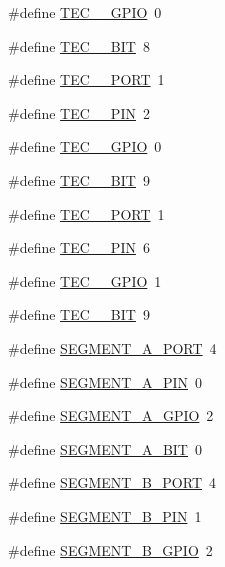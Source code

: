 \begin{DoxyCompactItemize}
\item 
\#define \hyperlink{group__hal_ga83ce1f0ab51ee7b4df55e629cdfc52d9}{T\+E\+C\+\_\+\_\+\+G\+P\+IO}~0
\item 
\#define \hyperlink{group__hal_gaed7549a304721e36693036c8a289ff4c}{T\+E\+C\+\_\+\_\+\+B\+IT}~8
\item 
\#define \hyperlink{group__hal_gac948c6a2caf0ef5cde7fa2c2e94fddb0}{T\+E\+C\+\_\+\_\+\+P\+O\+RT}~1
\item 
\#define \hyperlink{group__hal_gab976c4177676c5c89497cb89480e5dfe}{T\+E\+C\+\_\+\_\+\+P\+IN}~2
\item 
\#define \hyperlink{group__hal_gae8728c8f2e4279383925ff93a183b407}{T\+E\+C\+\_\+\_\+\+G\+P\+IO}~0
\item 
\#define \hyperlink{group__hal_ga64392cf03fba776f8a9dc238e25ec184}{T\+E\+C\+\_\+\_\+\+B\+IT}~9
\item 
\#define \hyperlink{group__hal_gadd513c832f5c617281c5df0dc67ae80c}{T\+E\+C\+\_\+\_\+\+P\+O\+RT}~1
\item 
\#define \hyperlink{group__hal_ga0b2447cd531de479b88f58f819566522}{T\+E\+C\+\_\+\_\+\+P\+IN}~6
\item 
\#define \hyperlink{group__hal_gaa5418f15596d7ada110c4105aa70e561}{T\+E\+C\+\_\+\_\+\+G\+P\+IO}~1
\item 
\#define \hyperlink{group__hal_gac7c8a49f0602d0aeee33923ce8708a4b}{T\+E\+C\+\_\+\_\+\+B\+IT}~9
\item 
\#define \hyperlink{group__hal_ga500ad2ec21fb16f64978b7bd003a1bf6}{S\+E\+G\+M\+E\+N\+T\+\_\+\+A\+\_\+\+P\+O\+RT}~4
\item 
\#define \hyperlink{group__hal_ga7aedeb2e8eecb0ba677b642f01ca6bd7}{S\+E\+G\+M\+E\+N\+T\+\_\+\+A\+\_\+\+P\+IN}~0
\item 
\#define \hyperlink{group__hal_ga94921c1a8815dfa09a147c982270fe23}{S\+E\+G\+M\+E\+N\+T\+\_\+\+A\+\_\+\+G\+P\+IO}~2
\item 
\#define \hyperlink{group__hal_gad1a6375015ba7b66143a96b950b2846f}{S\+E\+G\+M\+E\+N\+T\+\_\+\+A\+\_\+\+B\+IT}~0
\item 
\#define \hyperlink{group__hal_ga82edaa1ab6e1175396b7819fc1a742a4}{S\+E\+G\+M\+E\+N\+T\+\_\+\+B\+\_\+\+P\+O\+RT}~4
\item 
\#define \hyperlink{group__hal_ga8f8be8bc112341bb891770762ab53b85}{S\+E\+G\+M\+E\+N\+T\+\_\+\+B\+\_\+\+P\+IN}~1
\item 
\#define \hyperlink{group__hal_ga8999e65ed61b1e3f09f5304dbcb642ed}{S\+E\+G\+M\+E\+N\+T\+\_\+\+B\+\_\+\+G\+P\+IO}~2
\item 

\end{DoxyCompactItemize}
